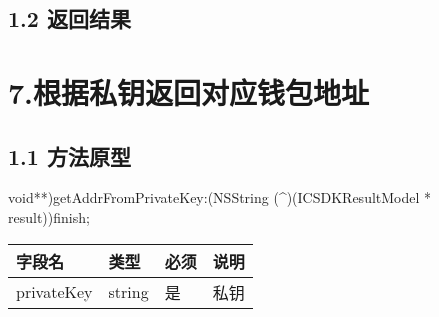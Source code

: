 \documentclass[letterpaper,10pt,english]{sphinxmanual}
\begin{document}
\subsection{1.2 返回结果}
\label{\detokenize{BCBWalletSDK_u63a5_u53e3_u8bf4_u660e:id113}}

\begin{sphinxVerbatim}[commandchars=\\\{\}]
     
     
\end{sphinxVerbatim}


\begin{sphinxVerbatim}[commandchars=\\\{\}]
     
\end{sphinxVerbatim}


\section{7.根据私钥返回对应钱包地址}
\label{\detokenize{BCBWalletSDK_u63a5_u53e3_u8bf4_u660e:id114}}

\subsection{1.1 方法原型}
\label{\detokenize{BCBWalletSDK_u63a5_u53e3_u8bf4_u660e:id115}}
\sphinxstylestrong{-(}void**)getAddrFromPrivateKey:(NSString (\textasciicircum{})(ICSDKResultModel * result))finish;



\begin{savenotes}\sphinxattablestart
\centering
\begin{tabulary}{\linewidth}[t]{|T|T|T|T|}
\hline
\sphinxstyletheadfamily 
字段名
&\sphinxstyletheadfamily 
类型
&\sphinxstyletheadfamily 
必须
&\sphinxstyletheadfamily 
说明
\\
\hline
privateKey
&
string
&
是
&
私钥
\\
\hline
\end{tabulary}
\par
\sphinxattableend\end{savenotes}
\end{document}
